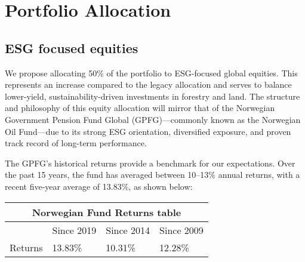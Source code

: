 





\section{Portfolio Allocation}
\subsection{ESG focused equities}
\par We propose allocating 50\% of the portfolio to ESG-focused global equities. This represents an increase compared to the legacy allocation and serves to balance lower-yield, sustainability-driven investments in forestry and land. The structure and philosophy of this equity allocation will mirror that of the Norwegian Government Pension Fund Global (GPFG)—commonly known as the Norwegian Oil Fund—due to its strong ESG orientation, diversified exposure, and proven track record of long-term performance.
\par The GPFG’s historical returns provide a benchmark for our expectations. Over the past 15 years, the fund has averaged between 10–13\% annual returns, with a recent five-year average of 13.83\%, as shown below:\\
\bigskip
\begin{center}
    

\begin{tabular}{ |p{3cm}||p{3cm}|p{3cm}|p{3cm}|  }
 \hline
 \multicolumn{4}{|c|}{Norwegian Fund Returns table} \\
 \hline
  & Since 2019 & Since 2014 & Since 2009\\
 \hline
 Returns   & 13.83\%    &10.31\%&  12.28\%\\
 
 \hline
\end{tabular}
\end{center}
\bigskip

